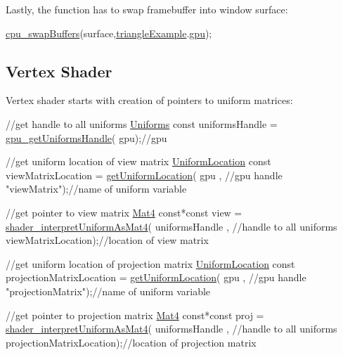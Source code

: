 Lastly, the function has to swap framebuffer into window surface\+: 
\begin{DoxyCodeInclude}
  \hyperlink{swapBuffers_8c_aa71ffc00c4f3d7e232828f8b7c47eb9b}{cpu\_swapBuffers}(surface,\hyperlink{triangleExample_8c_af82b723635ac0c90962571915a1b1163}{triangleExample}.\hyperlink{structTriangleExampleVariables_a6c5c3f82065ae9aac07f9e6f11dd03b3}{gpu});
\end{DoxyCodeInclude}
\hypertarget{triangleExample.c_VertexShader}{}\subsection{Vertex Shader}\label{triangleExample.c_VertexShader}
Vertex shader starts with creation of pointers to uniform matrices\+: 
\begin{DoxyCodeInclude}
  \textcolor{comment}{//get handle to all uniforms}
  \hyperlink{fwd_8h_a4e6b8a8d832d478e8d761c0a52163a7c}{Uniforms} \textcolor{keyword}{const} uniformsHandle = \hyperlink{gpu_8h_a72dddc46dcba2d4e515fc23b61f0819a}{gpu\_getUniformsHandle}(
      gpu);\textcolor{comment}{//gpu}

  \textcolor{comment}{//get uniform location of view matrix}
  \hyperlink{uniforms_8h_a0827d09b4e6a18f2718775e7e9289fbd}{UniformLocation} \textcolor{keyword}{const} viewMatrixLocation = \hyperlink{uniforms_8h_a6ea94982618b1c339a97a528b0670a53}{getUniformLocation}(
      gpu         , \textcolor{comment}{//gpu handle}
      \textcolor{stringliteral}{"viewMatrix"});\textcolor{comment}{//name of uniform variable}

  \textcolor{comment}{//get pointer to view matrix}
  \hyperlink{structMat4}{Mat4} \textcolor{keyword}{const}*\textcolor{keyword}{const} view = \hyperlink{uniforms_8h_a83cb2c94ffb0623e9bb8d9508885376a}{shader\_interpretUniformAsMat4}(
      uniformsHandle    , \textcolor{comment}{//handle to all uniforms}
      viewMatrixLocation);\textcolor{comment}{//location of view matrix}

  \textcolor{comment}{//get uniform location of projection matrix}
  \hyperlink{uniforms_8h_a0827d09b4e6a18f2718775e7e9289fbd}{UniformLocation} \textcolor{keyword}{const} projectionMatrixLocation = 
      \hyperlink{uniforms_8h_a6ea94982618b1c339a97a528b0670a53}{getUniformLocation}(
      gpu               , \textcolor{comment}{//gpu handle}
      \textcolor{stringliteral}{"projectionMatrix"});\textcolor{comment}{//name of uniform variable}

  \textcolor{comment}{//get pointer to projection matrix}
  \hyperlink{structMat4}{Mat4} \textcolor{keyword}{const}*\textcolor{keyword}{const} proj = \hyperlink{uniforms_8h_a83cb2c94ffb0623e9bb8d9508885376a}{shader\_interpretUniformAsMat4}(
      uniformsHandle          , \textcolor{comment}{//handle to all uniforms}
      projectionMatrixLocation);\textcolor{comment}{//location of projection matrix}
\end{DoxyCodeInclude}
